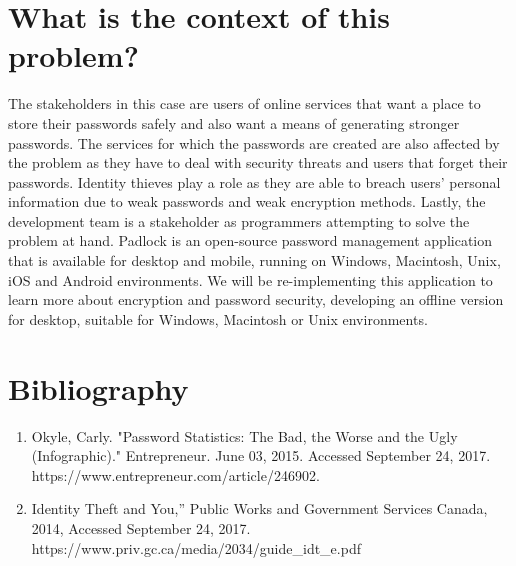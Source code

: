 \documentclass{article}
\begin{document}
\section*{What is the context of this problem?}
The stakeholders in this case are users of online services that want a place to store their passwords safely and also want a means of generating stronger passwords. The services for which the passwords are created are also affected by the problem as they have to deal with security threats and users that forget their passwords. Identity thieves play a role as they are able to breach users’ personal information due to weak passwords and weak encryption methods. Lastly, the development team is a stakeholder as programmers attempting to solve the problem at hand. Padlock is an open-source password management application that is available for desktop and mobile, running on Windows, Macintosh, Unix, iOS and Android environments. We will be re-implementing this application to learn more about encryption and password security, developing an offline version for desktop, suitable for Windows, Macintosh or Unix environments. 

\section*{Bibliography}
\begin{enumerate}
    \item Okyle, Carly. "Password Statistics: The Bad, the Worse and the Ugly (Infographic)." Entrepreneur. June 03, 2015. Accessed September 24, 2017. https://www.entrepreneur.com/article/246902.
    \item Identity Theft and You,” Public Works and Government Services Canada, 2014, Accessed September 24, 2017. https://www.priv.gc.ca/media/2034/guide\_idt\_e.pdf
\end{enumerate}
\end{document}
